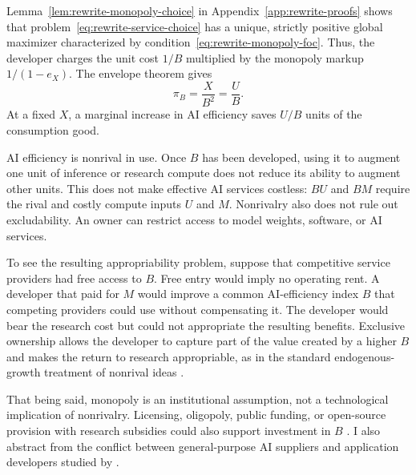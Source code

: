 Lemma~\ref{lem:rewrite-monopoly-choice} in
Appendix~\ref{app:rewrite-proofs} shows that
problem~\eqref{eq:rewrite-service-choice} has a unique, strictly positive
global maximizer characterized by condition~\eqref{eq:rewrite-monopoly-foc}.
Thus, the developer charges the unit cost $1/B$ multiplied by the monopoly
markup $1/(1-e_X)$.
The envelope theorem gives
\begin{equation}
 \pi_B=\frac{X}{B^2}=\frac{U}{B}.
 \label{eq:rewrite-profit-envelope}
\end{equation}
At a fixed $X$, a marginal increase in AI efficiency saves $U/B$ units of the consumption good.

AI efficiency is nonrival in use. Once $B$ has been developed, using it to
augment one unit of inference or research compute does not reduce its ability to augment other units. This does not make effective AI services costless: $BU$ and $BM$ require the rival and costly compute inputs $U$ and $M$. Nonrivalry also does not rule out excludability. An owner can restrict access to model weights, software, or AI services.

To see the resulting appropriability problem, suppose that competitive
service providers had free access to $B$. Free entry would imply no operating rent. A developer that paid for $M$ would improve a common AI-efficiency index $B$ that competing providers could use without compensating it. The developer would bear the research cost but could not appropriate the resulting benefits. %
Exclusive ownership allows the developer to capture part of the value created by a higher $B$ and makes the return to research appropriable, as in the standard endogenous-growth treatment of nonrival ideas \citep{romer1990}.

That being said, monopoly is an institutional assumption, not a technological implication of nonrivalry. Licensing, oligopoly, public funding, or open-source provision with research subsidies could also support investment in $B$ \citep{korinekvipra2025,gans2024,demireretal2025}. I also abstract from the conflict between general-purpose AI suppliers and application developers studied by \citet{liuwan2026}.

